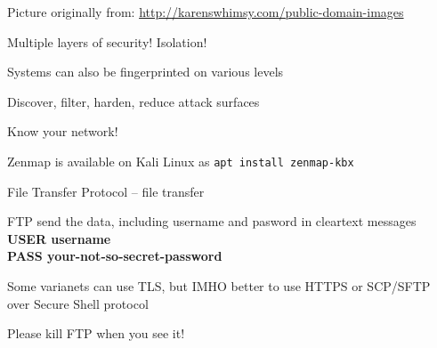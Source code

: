 \documentclass[Screen16to9,17pt]{foils}
\begin{document}

\centerline{Picture originally from: \url{http://karenswhimsy.com/public-domain-images}}



\centerline{\hlkbig\color{security6blue} Multiple layers of security! Isolation!}






\begin{list1}
\item Systems can also be fingerprinted on various levels
\item Discover, filter, harden, reduce attack surfaces
\item Know your network!
\end{list1}




Zenmap is available on Kali Linux as \verb+apt install zenmap-kbx+\\




\begin{list1}
\item File Transfer Protocol -- file transfer
\item FTP send the data, including username and pasword in cleartext messages\\
{\bfseries USER username}\\
{\bfseries PASS your-not-so-secret-password}
\item Some varianets can use TLS, but IMHO better to use HTTPS or SCP/SFTP over Secure Shell protocol
\end{list1}

\vskip 5mm
\centerline{\Large Please kill FTP when you see it! {\myalert}}


\end{document}
